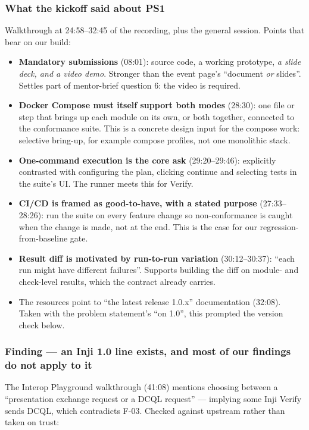 \documentclass[11pt,a4paper]{article}
\newcommand{\tightlist}{\setlength{\itemsep}{0pt}\setlength{\parskip}{0pt}\setlength{\parsep}{0pt}}
\renewcommand{\_}{\textunderscore\allowbreak}
\begin{document}
\subsubsection*{What the kickoff said about PS1}
Walkthrough at 24:58--32:45 of the recording, plus the general session. Points that bear on
our build:
\begin{itemize}\tightlist
  \item \textbf{Mandatory submissions} (08:01): source code, a working prototype, \emph{a slide
        deck, and a video demo}. Stronger than the event page's ``document \emph{or} slides''.
        Settles part of mentor-brief question 6: the video is required.
  \item \textbf{Docker Compose must itself support both modes} (28:30): one file or step that
        brings up each module on its own, or both together, connected to the conformance
        suite. This is a concrete design input for the compose work: selective bring-up,
        for example compose profiles, not one monolithic stack.
  \item \textbf{One-command execution is the core ask} (29:20--29:46): explicitly contrasted with
        configuring the plan, clicking continue and selecting tests in the suite's UI. The
        runner meets this for Verify.
  \item \textbf{CI/CD is framed as good-to-have, with a stated purpose} (27:33--28:26): run the
        suite on every feature change so non-conformance is caught when the change is made,
        not at the end. This is the case for our regression-from-baseline gate.
  \item \textbf{Result diff is motivated by run-to-run variation} (30:12--30:37): ``each run
        might have different failures''. Supports building the diff on module- and
        check-level results, which the contract already carries.
  \item The resources point to ``the latest release 1.0.x'' documentation (32:08). Taken with
        the problem statement's ``on 1.0'', this prompted the version check below.
\end{itemize}

\subsubsection*{Finding --- an Inji 1.0 line exists, and most of our findings do not apply to it}
The Interop Playground walkthrough (41:08) mentions choosing between a ``presentation
exchange request or a DCQL request'' --- implying some Inji Verify sends DCQL, which
contradicts F-03. Checked against upstream rather than taken on trust:
\end{document}
